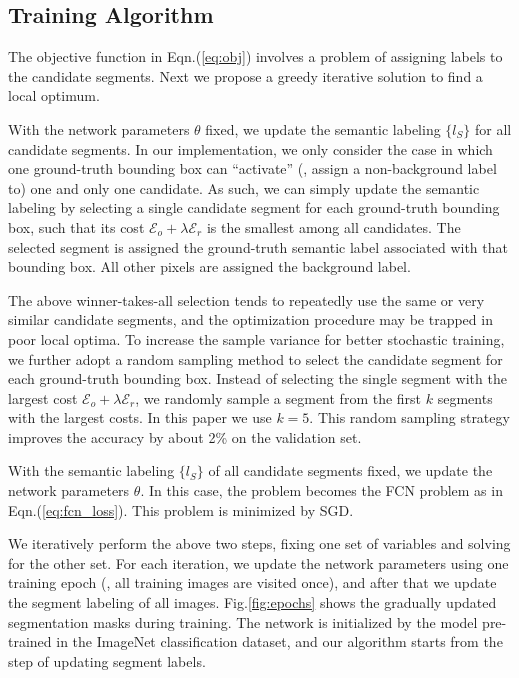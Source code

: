 \documentclass[10pt,twocolumn,letterpaper]{article}
\begin{document}
\subsection{Training Algorithm}
\label{sec:alg}

The objective function in Eqn.(\ref{eq:obj}) involves a problem of assigning labels to the candidate segments. Next we propose a greedy iterative solution to find a local optimum.

With the network parameters $\theta$ fixed, we update the semantic labeling $\{l_S\}$ for all candidate segments. In our implementation, we only consider the case in which one ground-truth bounding box can ``activate'' (\ie, assign a non-background label to) one and only one candidate. As such, we can simply update the semantic labeling by selecting a single candidate segment for each ground-truth bounding box, such that its cost $\mathcal{E}_o+\lambda\mathcal{E}_r$ is the smallest among all candidates. The selected segment is assigned the ground-truth semantic label associated with that bounding box. All other pixels are assigned the background label.

The above winner-takes-all selection tends to repeatedly use the same or very similar candidate segments, and the optimization procedure may be trapped in poor local optima. To increase the sample variance for better stochastic training, we further adopt a random sampling method to select the candidate segment for each ground-truth bounding box. Instead of selecting the single segment with the largest cost $\mathcal{E}_o+\lambda\mathcal{E}_r$, we randomly sample a segment from the first $k$ segments with the largest costs. In this paper we use $k=5$. This random sampling strategy improves the accuracy by about 2\% on the validation set.

With the semantic labeling $\{l_S\}$ of all candidate segments fixed, we update the network parameters $\theta$. In this case, the problem becomes the FCN problem \cite{Long2015} as in Eqn.(\ref{eq:fcn_loss}). This problem is minimized by SGD.

We iteratively perform the above two steps, fixing one set of variables and solving for the other set.
For each iteration, we update the network parameters using one training epoch (\ie, all training images are visited once), and after that we update the segment labeling of all images. Fig.\ref{fig:epochs} shows the gradually updated segmentation masks during training.
The network is initialized by the model pre-trained in the ImageNet classification dataset, and our algorithm starts from the step of updating segment labels.
\end{document}
